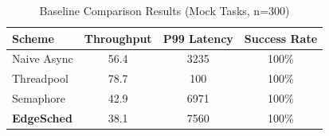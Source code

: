 \begin{table}[t]
\centering
\caption{Baseline Comparison Results (Mock Tasks, n=300)}
\label{tab:baseline}
\begin{tabular}{lccc}
\toprule
\textbf{Scheme} & \textbf{Throughput} & \textbf{P99 Latency} & \textbf{Success Rate} \\
\midrule
Naive Async & 56.4 & 3235 & 100\% \\
Threadpool & 78.7 & 100 & 100\% \\
Semaphore & 42.9 & 6971 & 100\% \\
\textbf{EdgeSched} & 38.1 & 7560 & 100\% \\
\bottomrule
\end{tabular}
\end{table}
